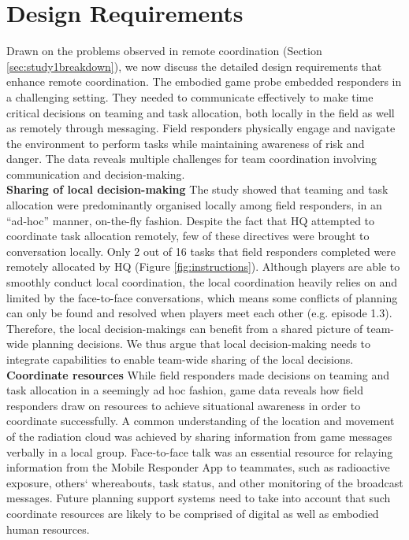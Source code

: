 \section{Design Requirements}\label{sec:study1requirements}
Drawn on the problems observed in remote coordination (Section \ref{sec:study1breakdown}), we now discuss the detailed design requirements that enhance remote coordination. The embodied game probe embedded responders in a challenging setting. They needed to communicate effectively to make time critical decisions on teaming and task allocation, both locally in the field as well as remotely through messaging. Field responders physically engage and navigate the environment to perform tasks while maintaining awareness of risk and danger. The data reveals multiple challenges for team coordination involving communication and decision-making. \\

\textbf{Sharing of local decision-making} The study showed that teaming and task allocation were predominantly organised locally among field responders, in an ``ad-hoc'' manner, on-the-fly fashion. Despite the fact that HQ attempted to coordinate task allocation remotely, few of these directives were brought to conversation locally. Only 2 out of 16 tasks that field responders completed were remotely allocated by HQ (Figure \ref{fig:instructions}). Although players are able to smoothly conduct local coordination, the local coordination heavily relies on and limited by the face-to-face conversations, which means some conflicts of planning can only be found and resolved when players meet each other (e.g. episode 1.3). Therefore, the local decision-makings can benefit from a shared picture of team-wide planning decisions. We thus argue that local decision-making needs to integrate capabilities to enable team-wide sharing of the local decisions.\\

\textbf{Coordinate resources} While field responders made decisions on teaming and task allocation in a seemingly ad hoc fashion, game data reveals how field responders draw on resources to achieve situational awareness in order to coordinate successfully. A common understanding of the location and movement of the radiation cloud was achieved by sharing information from game messages verbally in a local group. Face-to-face talk was an essential resource for relaying information from the Mobile Responder App to teammates, such as radioactive exposure, others` whereabouts, task status, and other monitoring of the broadcast messages. Future planning support systems need to take into account that such coordinate resources are likely to be comprised of digital as well as embodied human resources. \\

